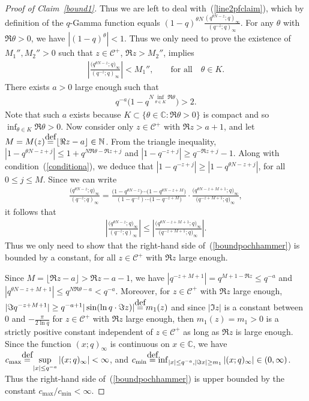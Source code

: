 \documentclass[11pt]{article}
\numberwithin{equation}{section}
\newcommand\myeq{\mathrel{\stackrel{\makebox[0pt]{\mbox{\normalfont\tiny def}}}{=}}}
\newcommand{\C}{\mathbb{C}}
\newcommand{\N}{\mathbb{N}}
\newcommand{\CC}{\mathcal{C}}
\begin{document}
\begin{proof}[Proof of Claim~\ref{bound1}]
Thus we are left to deal with~(\ref{line2pfclaim}), which by def\/inition of the $q$-Gamma function equals $(1 - q)^{\theta N}\frac{(q^{\theta N - z}; q)_{\infty}}{(q^{-z}; q)_{\infty}}$. For any $\theta$ with $\Re\theta > 0$, we have $|(1 - q)^{\theta}| < 1$. Thus we only need to prove the existence of $M_1'', M_2'' > 0$ such that $z\in\CC^+$, $\Re z > M_2''$, implies
\begin{gather}\label{boundthetaN}
\left| \frac{\big(q^{\theta N - z}; q\big)_{\infty}}{(q^{-z}; q)_{\infty}} \right| < M_1'',\qquad \textrm{for all} \quad \theta\in K.
\end{gather}
There exists $a > 0$ large enough such that
\begin{gather}\label{conditiona}
q^{-a} \big( 1 - q^{N\inf_{\theta\in K}{\Re \theta}} \big) > 2.
\end{gather}
Note that such $a$ exists because $K \subset \{\theta\in\C\colon \Re\theta > 0\}$ is compact and so $\inf_{\theta\in K}{\Re \theta} > 0$. Now consider only $z\in\CC^+$ with $\Re z > a+1$, and let $M = M(z) \myeq \lfloor \Re z - a \rfloor\in\N$. From the triangle inequality, $|1 - q^{\theta N - z + j}| \leq 1 + q^{N\Re\theta - \Re z + j}$ and $|1 - q^{-z+j}| \geq q^{-\Re z + j} - 1$. Along with condition~(\ref{conditiona}), we deduce that $|1 - q^{-z+j}| \geq |1 - q^{\theta N - z + j}|$, for all $0\leq j\leq M$. Since we can write
\begin{gather*}
\frac{\big(q^{\theta N - z}; q\big)_{\infty}}{(q^{- z}; q)_{\infty}} = \frac{\big(1 - q^{\theta N - z}\big)\cdots \big(1 - q^{\theta N - z + M}\big)}{(1 - q^{- z})\cdots \big(1 - q^{- z + M}\big)}\cdot\frac{\big(q^{\theta N - z + M + 1}; q\big)_{\infty}}{\big(q^{- z + M + 1}; q\big)_{\infty}},
\end{gather*}
it follows that
\begin{gather}\label{boundpochhammer}
\left| \frac{\big(q^{\theta N - z}; q\big)_{\infty}}{(q^{- z}; q)_{\infty}} \right| \leq \left| \frac{\big(q^{\theta N - z + M + 1}; q\big)_{\infty}}{\big(q^{- z + M + 1}; q\big)_{\infty}} \right|.
\end{gather}
Thus we only need to show that the right-hand side of~(\ref{boundpochhammer}) is bounded by a constant, for all $z\in\CC^+$ with $\Re z$ large enough.

Since $M = \lfloor \Re z - a \rfloor > \Re z - a -1$, we have $|q^{-z + M + 1}| = q^{M + 1 - \Re z} \leq q^{-a}$ and $|q^{\theta N - z + M + 1}| \leq q^{N\Re\theta - a} < q^{-a}$. Moreover, for $z\in\CC^+$ with $\Re z$ large enough, $|\Im q^{-z+M+1}| \geq q^{-a+1}|\sin(\ln{q}\cdot \Im z)| \myeq m_1(z)$ and since $|\Im z|$ is a constant between $0$ and $-\frac{\pi}{2\ln{q}}$ for $z\in\CC^+$ with $\Re z$ large enough, then $m_1(z) = m_1 > 0$ is a strictly positive constant independent of $z\in\CC^+$ as long as $\Re z$ is large enough. Since the function $(x; q)_{\infty}$ is continuous on $x\in\C$, we have $c_{\max} \myeq \sup\limits_{|x| \leq q^{-a}}{|(x; q)_{\infty}|} < \infty$, and $c_{\min} \myeq \inf_{|x|\leq q^{-a}, |\Im x| \geq m_1}{|(x; q)_{\infty}|} \in (0, \infty)$. Thus the right-hand side of~(\ref{boundpochhammer}) is upper bounded by the constant $c_{\max}/c_{\min} < \infty$.
\end{proof}
\end{document}
